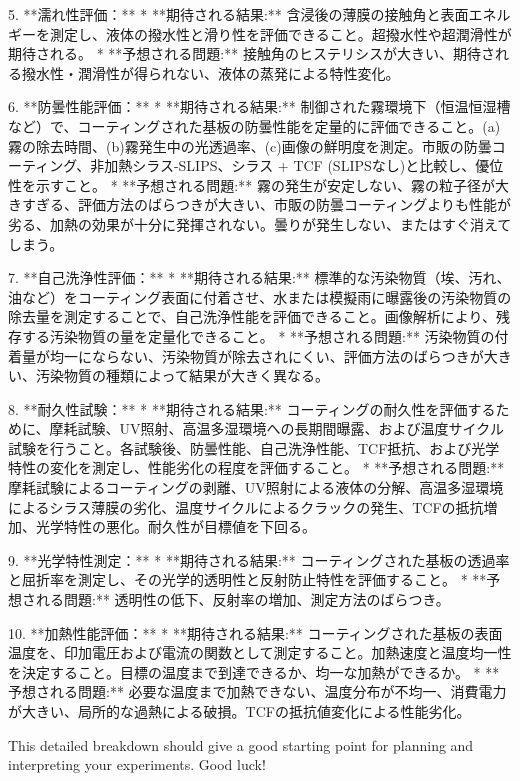 \documentclass{article}
\begin{document}
5.  **濡れ性評価：**
    *   **期待される結果:** 含浸後の薄膜の接触角と表面エネルギーを測定し、液体の撥水性と滑り性を評価できること。超撥水性や超潤滑性が期待される。
    *   **予想される問題:** 接触角のヒステリシスが大きい、期待される撥水性・潤滑性が得られない、液体の蒸発による特性変化。

6.  **防曇性能評価：**
    *   **期待される結果:** 制御された霧環境下（恒温恒湿槽など）で、コーティングされた基板の防曇性能を定量的に評価できること。(a)霧の除去時間、(b)霧発生中の光透過率、(c)画像の鮮明度を測定。市販の防曇コーティング、非加熱シラス-SLIPS、シラス + TCF (SLIPSなし)と比較し、優位性を示すこと。
    *   **予想される問題:** 霧の発生が安定しない、霧の粒子径が大きすぎる、評価方法のばらつきが大きい、市販の防曇コーティングよりも性能が劣る、加熱の効果が十分に発揮されない。曇りが発生しない、またはすぐ消えてしまう。

7.  **自己洗浄性評価：**
    *   **期待される結果:** 標準的な汚染物質（埃、汚れ、油など）をコーティング表面に付着させ、水または模擬雨に曝露後の汚染物質の除去量を測定することで、自己洗浄性能を評価できること。画像解析により、残存する汚染物質の量を定量化できること。
    *   **予想される問題:** 汚染物質の付着量が均一にならない、汚染物質が除去されにくい、評価方法のばらつきが大きい、汚染物質の種類によって結果が大きく異なる。

8.  **耐久性試験：**
    *   **期待される結果:** コーティングの耐久性を評価するために、摩耗試験、UV照射、高温多湿環境への長期間曝露、および温度サイクル試験を行うこと。各試験後、防曇性能、自己洗浄性能、TCF抵抗、および光学特性の変化を測定し、性能劣化の程度を評価すること。
    *   **予想される問題:** 摩耗試験によるコーティングの剥離、UV照射による液体の分解、高温多湿環境によるシラス薄膜の劣化、温度サイクルによるクラックの発生、TCFの抵抗増加、光学特性の悪化。耐久性が目標値を下回る。

9.  **光学特性測定：**
    *   **期待される結果:** コーティングされた基板の透過率と屈折率を測定し、その光学的透明性と反射防止特性を評価すること。
    *   **予想される問題:** 透明性の低下、反射率の増加、測定方法のばらつき。

10. **加熱性能評価：**
    *   **期待される結果:** コーティングされた基板の表面温度を、印加電圧および電流の関数として測定すること。加熱速度と温度均一性を決定すること。目標の温度まで到達できるか、均一な加熱ができるか。
    *   **予想される問題:** 必要な温度まで加熱できない、温度分布が不均一、消費電力が大きい、局所的な過熱による破損。TCFの抵抗値変化による性能劣化。

This detailed breakdown should give a good starting point for planning and interpreting your experiments. Good luck!
\end{document}
